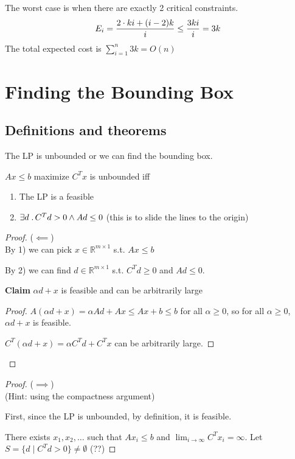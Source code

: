 \documentclass[12pt]{article}
\newcommand{\claim}[1]{\par {\bf Claim }{#1}}
\begin{document}
The worst case is when there are exactly 2 critical constraints.
$$E_i = {2 \cdot ki + (i - 2)k \over i} \leq {3ki \over i} = 3k$$
The total expected cost is $\sum_{i = 1}^n 3k = O(n)$

\section{Finding the Bounding Box}
\subsection{Definitions and theorems}
\begin{theorem}
  The LP is unbounded or we can find the bounding box.
\end{theorem}

\begin{lemma}
  $Ax \leq b$ maximize $C^T x$ is unbounded iff
  \begin{enumerate}[1)]
  \item The LP is a feasible
  \item $\exists d \;\ldotp C^T d > 0 \land Ad \leq 0$ (this is to
    slide the lines to the origin)
  \end{enumerate}
\end{lemma}
\begin{proof} ($\impliedby$)\\
  By 1) we can pick $x \in \mathbb{R}^{m \times 1}$ s.t. $Ax \leq b$

  By 2) we can find $d \in \mathbb{R}^{m \times 1}$ s.t. $C^T d \geq
  0$ and $Ad \leq 0$.
  
  \claim{$\alpha d + x$ is feasible and can be arbitrarily large}

  \begin{proof}
  $A(\alpha d + x) = \alpha A d + A x \leq Ax + b \leq b$ for all
  $\alpha \geq 0$, so for all $\alpha \geq 0$, $\alpha d + x$ is
  feasible.
  
  $C^T(\alpha d + x) = \alpha C^T d + C^T x$ can be arbitrarily large.
  \end{proof}
\end{proof}
\begin{proof} ($\implies$) \\
  (Hint: using the compactness argument)

  First, since the LP is unbounded, by definition, it is feasible.
  
  There exists $x_1, x_2, \dots$ such that $A x_i \leq b$ and
  $\lim_{i \to \infty} C^T x_i = \infty$. Let
  $S = \{d \mid C^T d > 0\} \neq \emptyset$ (??)
\end{proof}
\end{document}
